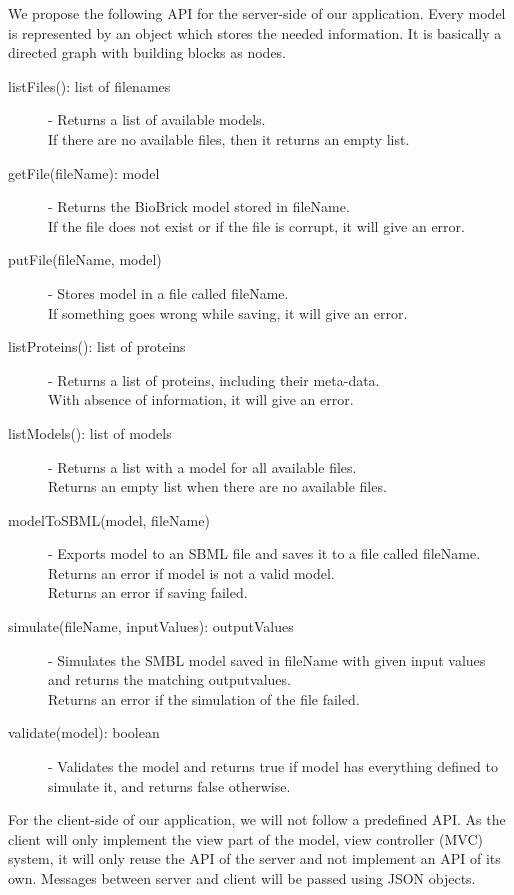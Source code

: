 \documentclass[a4paper]{article}
\begin{document}
We propose the following API for the server-side of our application. Every model is represented by an object which stores the needed information. It is basically a directed graph with building blocks as nodes. \\
\begin{description}
	\item[listFiles(): list of filenames] -
		Returns a list of available models.\\
		If there are no available files, then it returns an empty list.
	\item[getFile(fileName): model] -
		Returns the BioBrick model stored in fileName.\\
		If the file does not exist or if the file is corrupt, it will give an error.
	\item[putFile(fileName, model)] -
		Stores model in a file called fileName.\\
		If something goes wrong while saving, it will give an error.
	\item[listProteins(): list of proteins] -
		Returns a list of proteins, including their meta-data.\\
		With absence of information, it will give an error.
	\item[listModels(): list of models] -
		Returns a list with a model for all available files.\\
		Returns an empty list when there are no available files.
	\item[modelToSBML(model, fileName)] -
		Exports model to an SBML file and saves it to a file called fileName.\\
		Returns an error if model is not a valid model.\\
		Returns an error if saving failed.
	\item[simulate(fileName, inputValues): outputValues] -
		Simulates the SMBL model saved in fileName with given input values and returns the matching outputvalues.\\
		Returns an error if the simulation of the file failed.
	\item[validate(model): boolean] -
		Validates the model and returns true if model has everything defined to simulate it, and returns false otherwise.\\
\end{description}

For the client-side of our application, we will not follow a predefined API. As the client will only implement the view part of the model, view controller (MVC) system, it will only reuse the API of the server and not implement an API of its own. Messages between server and client will be passed using JSON objects. \\
\end{document}
